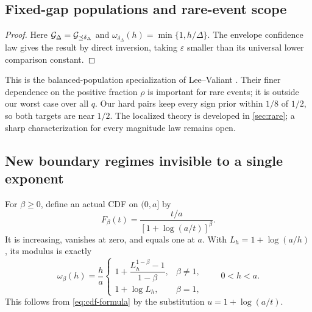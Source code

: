 \subsection{Fixed-gap populations and rare-event scope}
\begin{proof}
Here $\mathcal G_\Delta=\mathcal G_{\preceq\delta_\Delta}$ and
$\omega_{\delta_\Delta}(h)=\min\{1,h/\Delta\}$.
The envelope confidence law gives the result by direct inversion, taking
$\varepsilon$ smaller than its universal lower comparison constant.
\end{proof}
This is the balanced-population specialization of Lee--Valiant
\cite{leevaliant}. Their finer dependence on the positive fraction $\rho$
is important for rare events; it is outside our worst case over all $q$.
Our hard pairs keep every sign prior within $1/8$ of $1/2$, so both targets
are near $1/2$. The localized theory is developed in \cref{sec:rare}; a sharp
characterization for every magnitude law remains open.

\subsection{New boundary regimes invisible to a single exponent}
For $\beta\ge0$, define an actual CDF on $(0,a]$ by
\begin{equation}\label{eq:log-cdf}
 F_\beta(t)=\frac{t/a}{[1+\log(a/t)]^\beta}.
\end{equation}
It is increasing, vanishes at zero, and equals one at $a$.
With $L_h=1+\log(a/h)$, its modulus is exactly
\begin{equation}\label{eq:log-modulus}
 \omega_\beta(h)=\frac ha
 \begin{cases}
  1+\dfrac{L_h^{1-\beta}-1}{1-\beta},&\beta\ne1,\\[6pt]
  1+\log L_h,&\beta=1,
 \end{cases}\qquad 0<h<a.
\end{equation}
This follows from \eqref{eq:cdf-formula} by the substitution
$u=1+\log(a/t)$.

